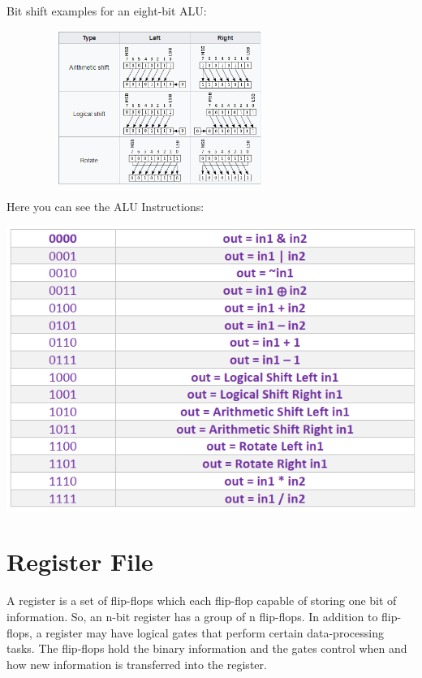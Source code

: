 \documentclass[11pt]{article}
\begin{document}
\bigskip

Bit shift examples for an eight-bit ALU:

\begin{center}
\includegraphics[width=10cm, height=5cm]{shift.png}
\end{center}

\bigskip

Here you can see the ALU Instructions:

\begin{center}
\includegraphics[]{Instructions.png}    
\end{center}


\section*{Register File}
A register is a set of flip-flops which each flip-flop capable of storing one bit of information. So, an n-bit register has a group of n flip-flops. In addition to flip-flops, a register may have logical gates that perform certain data-processing tasks. The flip-flops hold the binary information and the gates control when and how new information is transferred into the register. 
\end{document}
